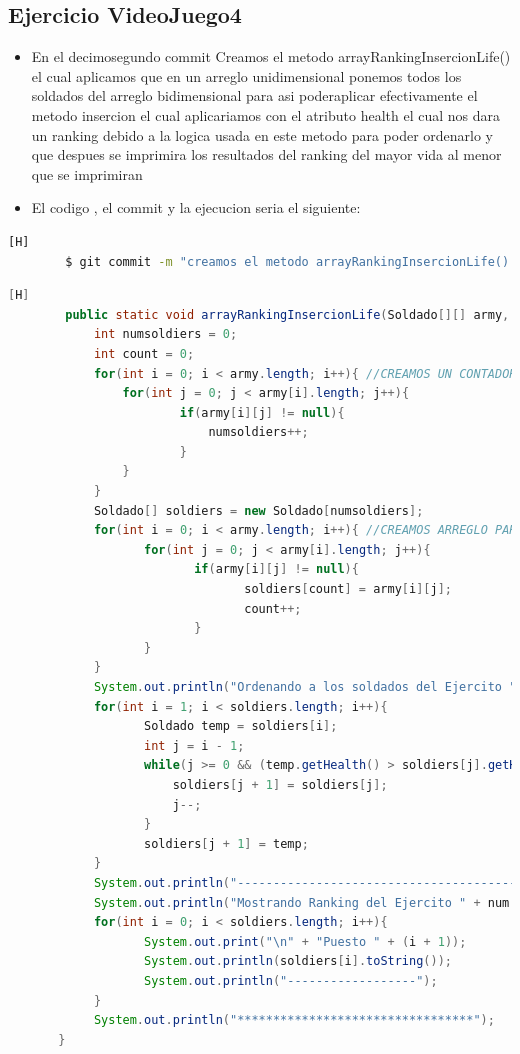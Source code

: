 \documentclass{article}
\begin{document}
	\subsection{Ejercicio VideoJuego4}
	\begin{itemize}	
		\item En el decimosegundo commit Creamos el metodo arrayRankingInsercionLife() el cual aplicamos que en un arreglo unidimensional ponemos todos los soldados del arreglo bidimensional para asi poderaplicar efectivamente el metodo insercion el cual aplicariamos con el atributo health el cual nos dara un ranking debido a la logica usada en este metodo para poder ordenarlo y que despues se imprimira los resultados del ranking del mayor vida al menor que se imprimiran
		\item El codigo , el commit y la ejecucion seria el siguiente:
	\end{itemize}	
	\begin{lstlisting}[language=bash,caption={Commit}][H]
		$ git commit -m "creamos el metodo arrayRankingInsercionLife() el cual aplicamos que en un arreglo unidimensional ponemos todos los soldados del arreglo bidimensional para asi poderaplicar efectivamente el metodo insercion el cual aplicariamos con el atributo health el cual nos dara un ranking debido a la logica usada en este metodo para poder ordenarlo y que despues se imprimira los resultados del ranking del mayor vida al menor que se imprimiran"
	\end{lstlisting}	
	\begin{lstlisting}[language=java,caption={Las lineas de codigos del metodo creado:}][H]
		public static void arrayRankingInsercionLife(Soldado[][] army, int num){
			int numsoldiers = 0;
			int count = 0;
			for(int i = 0; i < army.length; i++){ //CREAMOS UN CONTADOR PARA SABER EL NUMERO DE SOLDADOS DE ESTE EJERCITO Y DESPUES CREAR UN ARREGLO EL CUAL PODEAMOS DARLE ESTE TAMANO Y LO PODAMOS USAR PARA EL METODO BURBUJA
				for(int j = 0; j < army[i].length; j++){
						if(army[i][j] != null){
							numsoldiers++;
						}
				}
			}
			Soldado[] soldiers = new Soldado[numsoldiers];
			for(int i = 0; i < army.length; i++){ //CREAMOS ARREGLO PARA QUE LOS SOLDADOS SE TRASLADEN DE UN ARREGLO BIDIMENSIONAL A UNO DIMENSIONAL PARA APLICAR EL METODO INSERCION
				   for(int j = 0; j < army[i].length; j++){
						  if(army[i][j] != null){
								 soldiers[count] = army[i][j];
								 count++;
						  }
				   }
			}
			System.out.println("Ordenando a los soldados del Ejercito " + num + " por el insercion: ");  //APLICAMOS EL METODO INSERCION CON LOS PUNTOS DE VIDA
			for(int i = 1; i < soldiers.length; i++){
				   Soldado temp = soldiers[i];
				   int j = i - 1;
				   while(j >= 0 && (temp.getHealth() > soldiers[j].getHealth())){
					   soldiers[j + 1] = soldiers[j];
					   j--;
				   }
				   soldiers[j + 1] = temp;
			}
			System.out.println("------------------------------------------");
			System.out.println("Mostrando Ranking del Ejercito " + num + ".....");
			for(int i = 0; i < soldiers.length; i++){
				   System.out.print("\n" + "Puesto " + (i + 1));
				   System.out.println(soldiers[i].toString());
				   System.out.println("------------------");
			}
			System.out.println("*********************************");
	   }
	\end{lstlisting}
\end{document}
